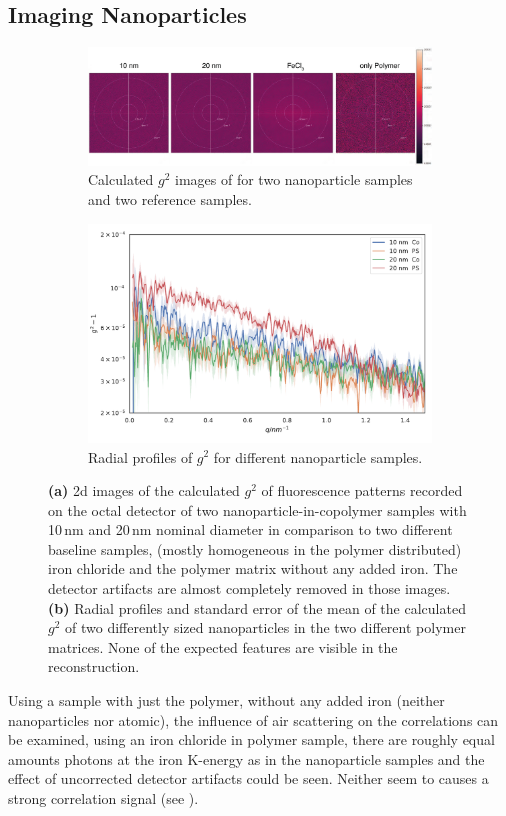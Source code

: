 \subsection{Imaging Nanoparticles}
\begin{figure}
	\centering
	\begin{subfigure}[b]{0.8\textwidth}
		\includegraphics[width=\linewidth]{images/resultnano2dr.pdf}
		\caption{Calculated $g^2$ images of for two nanoparticle samples and two reference samples.}
		\label{fig:resnano2d}
	\end{subfigure}
	\begin{subfigure}[b]{0.8\textwidth}
		\includegraphics[width=\linewidth]{images/resultnano.pdf}
		\caption{Radial profiles of $g^2$ for different nanoparticle samples.}
		\label{fig:resnanorad}
	\end{subfigure}
	\caption[Results Nanoparticles]{\textbf{(a)} 2d images of the calculated $g^2$ of fluorescence patterns recorded on the octal detector of two nanoparticle-in-copolymer samples with 10\,nm and 20\,nm nominal diameter in comparison to two different baseline samples, (mostly homogeneous in the polymer distributed) iron chloride and the polymer matrix without any added iron. The detector artifacts are almost completely removed in those images. \textbf{(b)} Radial profiles and standard error of the mean of the calculated $g^2$ of two differently sized nanoparticles in the two different polymer matrices. None of the expected features are visible in the reconstruction. }
	\label{fig:resnano}
\end{figure}
Using a sample with just the polymer, without any added iron (neither nanoparticles nor atomic), the influence of air scattering on the correlations can be examined, using an iron chloride in polymer sample, there are roughly equal amounts photons at the iron K-energy as in the nanoparticle samples and the effect of uncorrected detector artifacts could be seen. Neither seem to causes a strong correlation signal (see ). 
